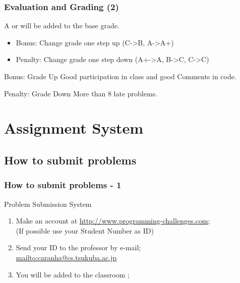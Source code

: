\documentclass{beamer}
\begin{document}
\begin{frame}
  \frametitle{Evaluation and Grading (2)}
  
  A  or  will be added to the base grade.
  \begin{itemize}
    \item Bonus: Change grade one step up (C->B, A->A+)
    \item Penalty: Change grade one step down (A+->A, B->C, \alert{C->C})
  \end{itemize}
  
  \medskip
  \begin{exampleblock}{Bonus: Grade Up}
    Good participation in class and good Comments in code.
  \end{exampleblock}
  \begin{alertblock}{Penalty: Grade Down}
    More than \alert{8} late problems.
  \end{alertblock}
\end{frame}

\section{Assignment System}
\subsection{How to submit problems}
\begin{frame}
  \frametitle{How to submit problems - 1}

  \begin{block}{Problem Submission System}
    \begin{enumerate}
      \item Make an account at \url{http://www.programming-challenges.com};\\ 
        {\small (If possible use your Student Number as ID)}
      \item Send your ID to the professor by e-mail;\\
        {\small \url{mailto:caranha@cs.tsukuba.ac.jp}}
      \item You will be added to the classroom
        ;        
    \end{enumerate}
  \end{block}
\end{frame}
\end{document}
